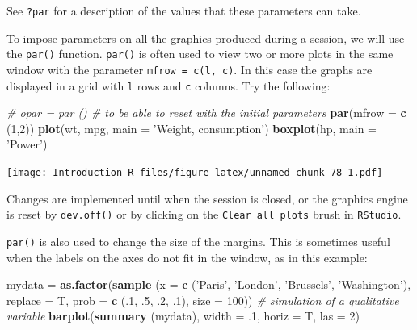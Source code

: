 \documentclass[]{book}
\newenvironment{Shaded}{\begin{snugshade}}{\end{snugshade}}
\newcommand{\CommentTok}[1]{\textcolor[rgb]{0.56,0.35,0.01}{\textit{#1}}}
\newcommand{\DataTypeTok}[1]{\textcolor[rgb]{0.13,0.29,0.53}{#1}}
\newcommand{\DecValTok}[1]{\textcolor[rgb]{0.00,0.00,0.81}{#1}}
\newcommand{\FloatTok}[1]{\textcolor[rgb]{0.00,0.00,0.81}{#1}}
\newcommand{\KeywordTok}[1]{\textcolor[rgb]{0.13,0.29,0.53}{\textbf{#1}}}
\newcommand{\NormalTok}[1]{#1}
\newcommand{\StringTok}[1]{\textcolor[rgb]{0.31,0.60,0.02}{#1}}
\begin{document}
See \texttt{?par} for a description of the values that these parameters can take.

To impose parameters on all the graphics produced during a session, we will use the \texttt{par()} function. \texttt{par()} is often used to view two or more plots in the same window with the parameter \texttt{mfrow\ =\ c(l,\ c)}. In this case the graphs are displayed in a grid with \texttt{l} rows and \texttt{c} columns. Try the following:

\begin{Shaded}
\begin{Highlighting}[]
\CommentTok{# opar = par () # to be able to reset with the initial parameters}
\KeywordTok{par}\NormalTok{(}\DataTypeTok{mfrow =} \KeywordTok{c}\NormalTok{ (}\DecValTok{1}\NormalTok{,}\DecValTok{2}\NormalTok{))}
\KeywordTok{plot}\NormalTok{(wt, mpg, }\DataTypeTok{main =} \StringTok{'Weight, consumption'}\NormalTok{)}
\KeywordTok{boxplot}\NormalTok{(hp, }\DataTypeTok{main =} \StringTok{'Power'}\NormalTok{)}
\end{Highlighting}
\end{Shaded}

\texttt{[image: Introduction-R\_files/figure-latex/unnamed-chunk-78-1.pdf]}

Changes are implemented until when the session is closed, or the graphics engine is reset by \texttt{dev.off()} or by clicking on the \texttt{Clear\ all\ plots} brush in \texttt{RStudio}.

\texttt{par()} is also used to change the size of the margins. This is sometimes useful when the labels on the axes do not fit in the window, as in this example:

\begin{Shaded}
\begin{Highlighting}[]
\NormalTok{mydata =}\StringTok{ }\KeywordTok{as.factor}\NormalTok{(}\KeywordTok{sample}\NormalTok{ (}\DataTypeTok{x =} \KeywordTok{c}\NormalTok{ (}\StringTok{'Paris'}\NormalTok{, }\StringTok{'London'}\NormalTok{, }\StringTok{'Brussels'}\NormalTok{, }\StringTok{'Washington'}\NormalTok{),}
                           \DataTypeTok{replace =}\NormalTok{ T,}
                           \DataTypeTok{prob =} \KeywordTok{c}\NormalTok{ (.}\DecValTok{1}\NormalTok{, }\FloatTok{.5}\NormalTok{, }\FloatTok{.2}\NormalTok{, }\FloatTok{.1}\NormalTok{),}
                           \DataTypeTok{size =} \DecValTok{100}\NormalTok{)) }\CommentTok{# simulation of a qualitative variable}
\KeywordTok{barplot}\NormalTok{(}\KeywordTok{summary}\NormalTok{ (mydata),}
        \DataTypeTok{width =} \FloatTok{.1}\NormalTok{,}
        \DataTypeTok{horiz =}\NormalTok{ T,}
        \DataTypeTok{las =} \DecValTok{2}\NormalTok{)}
\end{Highlighting}
\end{Shaded}
\end{document}
